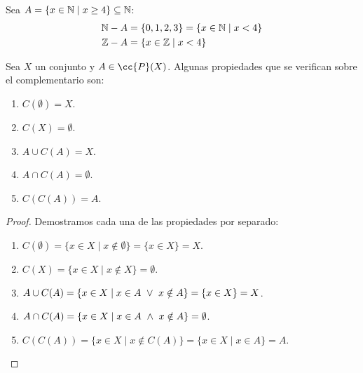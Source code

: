 \begin{ejemplo}
    Sea $A = \{x \in \mathbb N \mid x \geq 4\} \subseteq \mathbb N$:
    \begin{align*}
        \mathbb N - A &= \{0, 1, 2, 3\} = \{x \in \mathbb N \mid x < 4\}\\
        \mathbb Z - A &= \{x \in \mathbb Z \mid x < 4\}
    \end{align*}
\end{ejemplo}

\begin{prop} Sea $X$ un conjunto y $A \in \cc{P}(X)$. Algunas propiedades que se verifican sobre el complementario son:
    \begin{enumerate}
        \item $C(\emptyset) = X$.
        \item $C(X) = \emptyset$.
        \item $A \cup C(A) = X$.
        \item $A \cap C(A) = \emptyset$.
        \item $C(C(A)) = A$.
    \end{enumerate}
\end{prop}
\begin{proof}
    Demostramos cada una de las propiedades por separado:
    \begin{enumerate}
        \item $C(\emptyset) = \{x \in X \mid x \notin \emptyset\} = \{x \in X\} = X$.
        \item $C(X) = \{x \in X \mid x \notin X\} = \emptyset$.
        \item $A \cup C(A) = \{x \in X \mid x \in A \ \lor \  x \notin A \} = \{x \in X\} = X$.
        \item $A \cap C(A) = \{x \in X \mid x \in A \ \land \  x \notin A\} = \emptyset$.
        \item $C(C(A)) = \{x \in X \mid x \notin C(A) \} = \{x \in X \mid x \in A\} = A$.
    \end{enumerate}
\end{proof}

